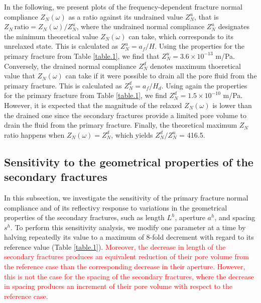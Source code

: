 \documentclass[draft]{agujournal2019}
\newcommand{\red}{\textcolor{red}}
\begin{document}
In the following, we present plots of the frequency-dependent fracture normal compliance $Z_N (\omega)$ as a ratio against its undrained value $Z^u_{N}$, that is $Z_N\,\text{ratio} =Z_N (\omega)/ Z^u_{N}$, where the undrained normal compliance  $Z^u_{N}$ designates the minimum theoretical value $Z_N (\omega)$ can take, which corresponds to its unrelaxed state. This is calculated as $Z^u_{N}= a_f/H$. Using the properties for the primary fracture from Table \ref{table.1}, we  find that $Z^u_{N} =3.6 \times 10 ^{-13}$  m/Pa. Conversely, the drained normal compliance $Z^d_{N}$ denotes maximum thoeretical value that $Z_N (\omega)$ can take if it were possible to drain all the pore fluid from the primary fracture. This is calculated as
$Z^d_{N}= a_f/H_d$. Using again the properties for the primary fracture from Table \ref{table.1}, we find  $Z^d_{N} =1.5\times 10^{-10} $ m/Pa. However, it is expected that the magnitude of the relaxed $Z_N(\omega)$ is lower than the drained one since the secondary fractures provide a limited pore volume to drain the fluid from the primary fracture.
Finally, the theoretical maximum $Z_N$ ratio happens when  $Z_N (\omega) = Z^d_{N} $, which yields $Z^d_{N}/Z^u_{N}$ = 416.5. 


\subsection{Sensitivity to the geometrical properties of the secondary fractures}
In this subsection, we investigate the sensitivity of the primary fracture normal compliance and of its reflectivy response to variations in the geometrical properties of the secondary fractures, such as length $L^h$, aperture $a^h $, and spacing $s^h$. To perform this sensitivity analysis, we modify one parameter at a time by halving repeatedly its value to a maximum of 8-fold decrement with regard to its reference value (Table \ref{table.1}). \red{Moreover, the decrease in length  of the secondary fractures produces an equivalent reduction of their pore volume from the reference case than the corresponding decrease in their aperture. However, this is not the case for the spacing of the secondary fractures, where the decrease in spacing produces an increment of their pore volume with respect to the reference case. }
\end{document}
